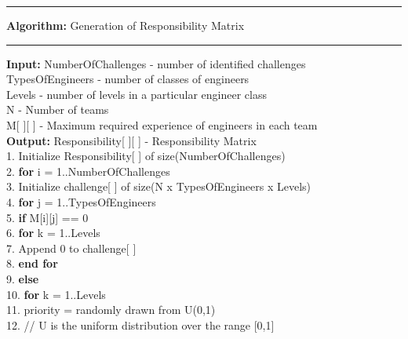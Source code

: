 \par\noindent\rule{\textwidth}{0.4pt}
\textbf{Algorithm:} Generation of Responsibility Matrix
\vspace{4pt}
\hrule
\vspace{3pt}
\noindent\textbf{Input: }NumberOfChallenges - number of identified challenges\\ \hspace*{12mm}TypesOfEngineers - number of classes of engineers\\\hspace*{12mm}Levels - number of levels in a particular engineer class\\\hspace*{12mm}N - Number of teams \\\hspace*{12mm}M[ ][ ] - Maximum required experience of engineers in each team\vspace{2mm}\\
\vspace{4mm}
\noindent\textbf{Output: }Responsibility[ ][ ] - Responsibility Matrix\\
1. Initialize Responsibility[ ] of size(NumberOfChallenges)\\      
2. \textbf{for} i = 1..NumberOfChallenges\\
3. Initialize challenge[ ] of size(N x TypesOfEngineers x Levels)\\
4. \hspace*{0.5cm}\textbf{for} j = 1..TypesOfEngineers\\
5. \hspace*{1cm}\textbf{if} M[i][j] == 0\\
6. \hspace*{1.5cm}\textbf{for} k = 1..Levels\\
7. \hspace*{2cm}Append 0 to challenge[ ]\\
8. \hspace*{1.5cm} \textbf{end for}\\
9. \hspace*{1cm}\textbf{else}\\
10. \hspace*{1.5cm}\textbf{for} k = 1..Levels\\
11. \hspace*{2cm}priority = randomly drawn from U(0,1)\\
12. \hspace*{2cm}// U is the uniform distribution over the range [0,1]\\
